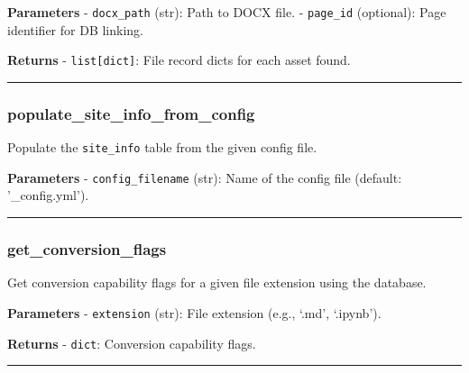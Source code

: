 \textbf{Parameters} - \texttt{docx\_path} (str): Path to DOCX file. -
\texttt{page\_id} (optional): Page identifier for DB linking.

\textbf{Returns} - \texttt{list{[}dict{]}}: File record dicts for each
asset found.

\begin{center}\rule{0.5\linewidth}{0.5pt}\end{center}

\subsubsection{populate\_site\_info\_from\_config}\label{populate_site_info_from_config}

\begin{Shaded}
\begin{Highlighting}[]
\OperatorTok{=}\NormalTok{)}
\end{Highlighting}
\end{Shaded}

Populate the \texttt{site\_info} table from the given config file.

\textbf{Parameters} - \texttt{config\_filename} (str): Name of the
config file (default: '\_config.yml').

\begin{center}\rule{0.5\linewidth}{0.5pt}\end{center}

\subsubsection{get\_conversion\_flags}\label{get_conversion_flags}

\begin{Shaded}
\begin{Highlighting}[]
\end{Highlighting}
\end{Shaded}

Get conversion capability flags for a given file extension using the
database.

\textbf{Parameters} - \texttt{extension} (str): File extension (e.g.,
`.md', `.ipynb').

\textbf{Returns} - \texttt{dict}: Conversion capability flags.

\begin{center}\rule{0.5\linewidth}{0.5pt}\end{center}

